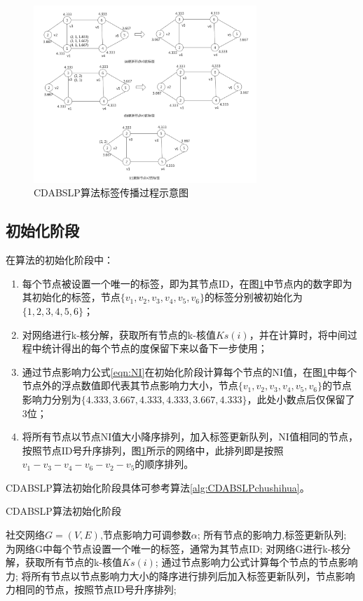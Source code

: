 \begin{figure}
  \centering
  \includegraphics[width=0.75\textwidth]{figures/CDABSLPshili}
  \caption{CDABSLP算法标签传播过程示意图}\label{fig:CDABSLPshili}
 \end{figure}

\subsection{初始化阶段}

在算法的初始化阶段中：
\begin{enumerate}
  \item 每个节点被设置一个唯一的标签，即为其节点ID，在图\ref{fig:CDABSLPshili}中节点内的数字即为其初始化的标签，节点$\{ v_1,v_2,v_3,v_4,v_5,v_6 \} $的标签分别被初始化为$\{ 1,2,3,4,5,6 \} $；
  \item 对网络进行k-核分解，获取所有节点的k-核值$Ks(i)$，并在计算时，将中间过程中统计得出的每个节点的度保留下来以备下一步使用；
  \item 通过节点影响力公式\ref{eqn:NI}在初始化阶段计算每个节点的NI值，在图\ref{fig:CDABSLPshili}中每个节点外的浮点数值即代表其节点影响力大小，节点$\{ v_1,v_2,v_3,v_4,v_5,v_6 \} $的节点影响力分别为$\{ 4.333,3.667,4.333,4.333,3.667,4.333 \} $，此处小数点后仅保留了3位；
  \item 将所有节点以节点NI值大小降序排列，加入标签更新队列，NI值相同的节点，按照节点ID号升序排列，图\ref{fig:CDABSLPshili}所示的网络中，此排列即是按照$v_1-v_3-v_4-v_6-v_2-v_5$的顺序排列。
\end{enumerate}
CDABSLP算法初始化阶段具体可参考算法\ref{alg:CDABSLPchushihua}。

\begin{algorithm}[h]  
  \caption{CDABSLP算法初始化阶段}  
  \label{alg:CDABSLPchushihua} 
  \begin{algorithmic}[1]  
    \Require  
      社交网络$G=(V,E)$,节点影响力可调参数$\alpha$;  
    \Ensure  
      所有节点的影响力,标签更新队列;  
    \State 为网络G中每个节点设置一个唯一的标签，通常为其节点ID;  
    \State 对网络G进行k-核分解，获取所有节点的k-核值$Ks(i)$; 
    \State 通过节点影响力公式计算每个节点的节点影响力; 
    \State 将所有节点以节点影响力大小的降序进行排列后加入标签更新队列，节点影响力相同的节点，按照节点ID号升序排列; 
  \end{algorithmic}  
\end{algorithm}  

